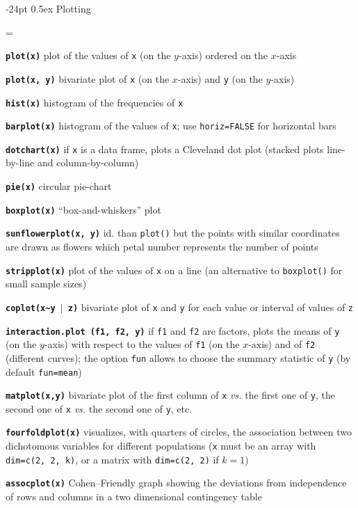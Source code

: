 \documentclass[10pt,landscape]{article}
\makeatletter
\renewcommand\section{\@startsection{section}{1}{0mm}%
                                     {-24pt}%
                                     {0.5ex}%
                                {\color{blue}\normalfont\large\bfseries}}
\newcommand{\code}{\texttt}
\newcommand{\bcode}[1]{\texttt{\textbf{#1}}}
\makeatother
\begin{document}
\begin{multicols*}{3}
\section{Plotting}

\everypar={\hangindent=9mm}

\bcode{plot(x)}  plot of the values of \code{x} (on the $y$-axis) ordered on the $x$-axis

\bcode{plot(x, y)}  bivariate plot of \code{x} (on the $x$-axis) and \code{y} (on the $y$-axis)

\bcode{hist(x)}  histogram of the frequencies of \code{x}

\bcode{barplot(x)}  histogram of the values of \code{x}; use
\code{horiz=FALSE} for horizontal bars

\bcode{dotchart(x)}  if \code{x} is a data frame, plots a Cleveland dot plot (stacked plots line-by-line and column-by-column)

\bcode{pie(x)}  circular pie-chart

\bcode{boxplot(x)}  ``box-and-whiskers'' plot

\bcode{sunflowerplot(x, y)}  id. than \code{plot()} but the points with similar coordinates are drawn as flowers which petal number represents the number of points

\bcode{stripplot(x)}  plot of the values of \code{x} on a line (an alternative to \code{boxplot()} for small sample sizes)

\bcode{coplot(x\~{}y $\mid$ z)}  bivariate plot of \code{x} and \code{y} for each value or interval of values of \code{z}

\bcode{interaction.plot (f1, f2, y)}  if \code{f1} and \code{f2} are factors, plots the means of \code{y} (on the $y$-axis) with respect to the values of \code{f1} (on the $x$-axis) and of \code{f2} (different curves); the option \code{fun} allows to choose the summary statistic of \code{y} (by default \code{fun=mean})

\bcode{matplot(x,y)}  bivariate plot of the first column of \code{x} {\it vs.} the first one of \code{y}, the second one of \code{x} {\it vs.} the second one of \code{y}, etc.

\bcode{fourfoldplot(x)}  visualizes, with quarters of circles, the association between two dichotomous variables for different populations (\code{x} must be an array with \code{dim=c(2, 2, k)}, or a matrix with \code{dim=c(2, 2)} if $k=1$)

\bcode{assocplot(x)}  Cohen--Friendly graph showing the deviations  from independence of rows and columns in a two dimensional contingency table


\end{multicols*}
\end{document}
